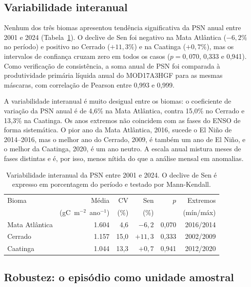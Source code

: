 \documentclass[a4paper,fleqn]{cas-sc}
\begin{document}
\subsection{Variabilidade interanual}

Nenhum dos três biomas apresentou tendência significativa da PSN anual entre 2001 e 2024 (Tabela~\ref{tab:interanual}). O declive de Sen foi negativo na Mata Atlântica ($-6{,}2\%$ no período) e positivo no Cerrado ($+11{,}3\%$) e na Caatinga ($+0{,}7\%$), mas os intervalos de confiança cruzam zero em todos os casos ($p = 0{,}070$, 0,333 e 0,941). Como verificação de consistência, a soma anual de PSN foi comparada à produtividade primária líquida anual do MOD17A3HGF para as mesmas máscaras, com correlação de Pearson entre 0,993 e 0,999.

A variabilidade interanual é muito desigual entre os biomas: o coeficiente de variação da PSN anual é de 4,6\% na Mata Atlântica, contra 15,0\% no Cerrado e 13,3\% na Caatinga. Os anos extremos não coincidem com as fases do ENSO de forma sistemática. O pior ano da Mata Atlântica, 2016, sucede o El Niño de 2014--2016, mas o melhor ano do Cerrado, 2009, é também um ano de El Niño, e o melhor da Caatinga, 2020, é um ano neutro. A escala anual mistura meses de fases distintas e é, por isso, menos nítida do que a análise mensal em anomalias.

\begin{table}[width=\linewidth,cols=6,pos=!ht]
\caption{Variabilidade interanual da PSN entre 2001 e 2024. O declive de Sen é expresso em porcentagem do período e testado por Mann-Kendall.}
\label{tab:interanual}
\begin{tabular*}{\tblwidth}{@{}lrrrrr@{}}
\toprule
Bioma & Média & CV & Sen & $p$ & Extremos \\
 & (gC~m$^{-2}$~ano$^{-1}$) & (\%) & (\%) & & (mín/máx) \\
\midrule
Mata Atlântica & 1.604 & 4,6  & $-6{,}2$  & 0,070 & 2016/2014 \\
Cerrado        & 1.157 & 15,0 & $+11{,}3$ & 0,333 & 2002/2009 \\
Caatinga       & 1.044 & 13,3 & $+0{,}7$  & 0,941 & 2012/2020 \\
\bottomrule
\end{tabular*}
\end{table}

\subsection{Robustez: o episódio como unidade amostral}
\end{document}
